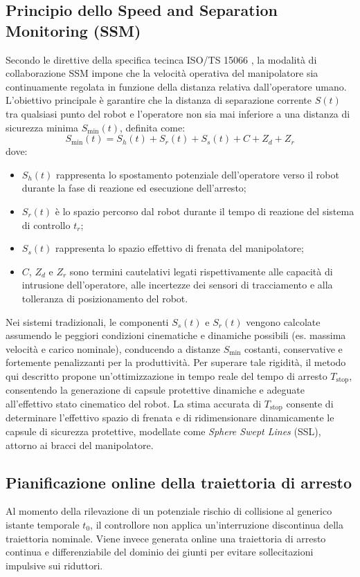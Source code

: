 \subsection{Principio dello Speed and Separation Monitoring (SSM)}
Secondo le direttive della specifica tecinca ISO/TS 15066 \cite{ISO15066}, la modalità di collaborazione SSM impone che la velocità operativa del manipolatore sia continuamente regolata in funzione della distanza relativa dall'operatore umano. L'obiettivo principale è garantire che la distanza di separazione corrente $S(t)$ tra qualsiasi punto del robot e l'operatore non sia mai inferiore a una distanza di sicurezza minima $S_{\text{min}}(t)$, definita come:
\begin{equation}
    S_{\text{min}}(t) = S_h(t) + S_r(t) + S_s(t) + C + Z_d + Z_r
    \label{eq:iso_ssm_distance}
\end{equation}
dove:
\begin{itemize}
    \item $S_h(t)$ rappresenta lo spostamento potenziale dell'operatore verso il robot durante la fase di reazione ed esecuzione dell'arresto;
    \item $S_r(t)$ è lo spazio percorso dal robot durante il tempo di reazione del sistema di controllo $t_r$;
    \item $S_s(t)$ rappresenta lo spazio effettivo di frenata del manipolatore;
    \item $C$, $Z_d$ e $Z_r$ sono termini cautelativi legati rispettivamente alle capacità di intrusione dell'operatore, alle incertezze dei sensori di tracciamento e alla tolleranza di posizionamento del robot.
\end{itemize}

Nei sistemi tradizionali, le componenti $S_s(t)$ e $S_r(t)$ vengono calcolate assumendo le peggiori condizioni cinematiche e dinamiche possibili (es. massima velocità e carico nominale), conducendo a distanze $S_{\text{min}}$ costanti, conservative e fortemente penalizzanti per la produttività. Per superare tale rigidità, il metodo qui descritto propone un'ottimizzazione in tempo reale del tempo di arresto $T_{\text{stop}}$, consentendo la generazione di capsule protettive dinamiche e adeguate all'effettivo stato cinematico del robot. La stima accurata di $T_{\text{stop}}$ consente di determinare l'effettivo spazio di frenata e di ridimensionare dinamicamente le capsule di sicurezza protettive, modellate come \textit{Sphere Swept Lines} (SSL), attorno ai bracci del manipolatore.

\subsection{Pianificazione online della traiettoria di arresto}
\label{subsec:traiettoria_stop}
Al momento della rilevazione di un potenziale rischio di collisione al generico istante temporale $t_0$, il controllore non applica un'interruzione discontinua della traiettoria nominale. Viene invece generata online una traiettoria di arresto continua e differenziabile del dominio dei giunti per evitare sollecitazioni impulsive sui riduttori. 

